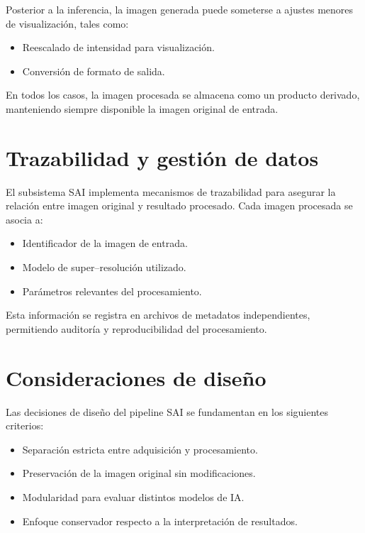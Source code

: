 Posterior a la inferencia, la imagen generada puede someterse a ajustes menores
de visualización, tales como:
\begin{itemize}
    \item Reescalado de intensidad para visualización.
    \item Conversión de formato de salida.
\end{itemize}

En todos los casos, la imagen procesada se almacena como un producto derivado,
manteniendo siempre disponible la imagen original de entrada.

\section{Trazabilidad y gestión de datos}

El subsistema SAI implementa mecanismos de trazabilidad para asegurar la relación
entre imagen original y resultado procesado. Cada imagen procesada se asocia a:

\begin{itemize}
    \item Identificador de la imagen de entrada.
    \item Modelo de super--resolución utilizado.
    \item Parámetros relevantes del procesamiento.
\end{itemize}

Esta información se registra en archivos de metadatos independientes, permitiendo
auditoría y reproducibilidad del procesamiento.

\section{Consideraciones de diseño}

Las decisiones de diseño del pipeline SAI se fundamentan en los siguientes
criterios:

\begin{itemize}
    \item Separación estricta entre adquisición y procesamiento.
    \item Preservación de la imagen original sin modificaciones.
    \item Modularidad para evaluar distintos modelos de IA.
    \item Enfoque conservador respecto a la interpretación de resultados.
\end{itemize}

